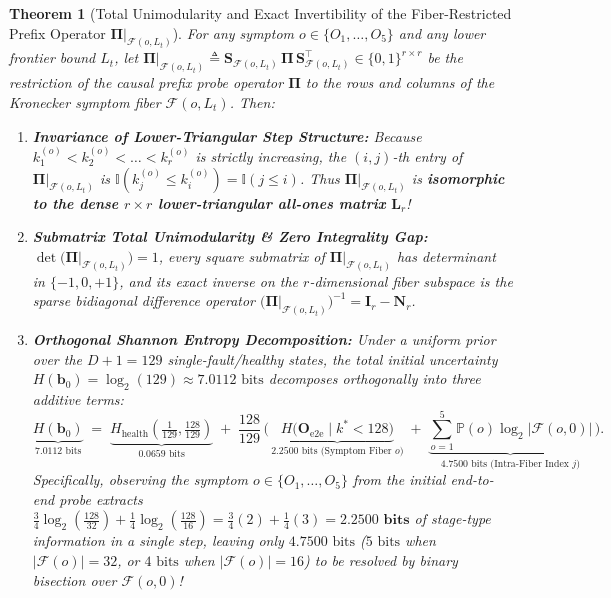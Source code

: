 \documentclass[11pt,a4paper]{article}
\newtheorem{theorem}{Theorem}[section]
\theoremstyle{definition}
\theoremstyle{remark}
\begin{document}
\begin{theorem}[Total Unimodularity and Exact Invertibility of the Fiber-Restricted Prefix Operator $\bm{\Pi}|_{\mathcal{F}(o, L_t)}$]
For any symptom $o \in \{O_1, \dots, O_5\}$ and any lower frontier bound $L_t$, let $\bm{\Pi}|_{\mathcal{F}(o, L_t)} \triangleq \bm{S}_{\mathcal{F}(o, L_t)} \, \bm{\Pi} \, \bm{S}_{\mathcal{F}(o, L_t)}^\top \in \{0,1\}^{r \times r}$ be the restriction of the causal prefix probe operator $\bm{\Pi}$ to the rows and columns of the Kronecker symptom fiber $\mathcal{F}(o, L_t)$. Then:
\begin{enumerate}
    \item \textbf{Invariance of Lower-Triangular Step Structure:} Because $k_1^{(o)} < k_2^{(o)} < \dots < k_r^{(o)}$ is strictly increasing, the $(i, j)$-th entry of $\bm{\Pi}|_{\mathcal{F}(o, L_t)}$ is $\mathbb{I}(k_j^{(o)} \le k_i^{(o)}) = \mathbb{I}(j \le i)$. Thus $\bm{\Pi}|_{\mathcal{F}(o, L_t)}$ is \textbf{isomorphic to the dense $r \times r$ lower-triangular all-ones matrix $\bm{L}_r$}!
    \item \textbf{Submatrix Total Unimodularity \& Zero Integrality Gap:} $\det\big(\bm{\Pi}|_{\mathcal{F}(o, L_t)}\big) = 1$, every square submatrix of $\bm{\Pi}|_{\mathcal{F}(o, L_t)}$ has determinant in $\{-1, 0, +1\}$, and its exact inverse on the $r$-dimensional fiber subspace is the sparse bidiagonal difference operator $\big(\bm{\Pi}|_{\mathcal{F}(o, L_t)}\big)^{-1} = \bm{I}_r - \bm{N}_r$.
    \item \textbf{Orthogonal Shannon Entropy Decomposition:} Under a uniform prior over the $D+1 = 129$ single-fault/healthy states, the total initial uncertainty $H(\bm{b}_0) = \log_2(129) \approx 7.0112\text{ bits}$ decomposes orthogonally into three additive terms:
    \begin{equation}
        \underbrace{H(\bm{b}_0)}_{7.0112\text{ bits}} \;=\;
        \underbrace{H_{\text{health}}\!\left(\tfrac{1}{129}, \tfrac{128}{129}\right)}_{0.0659\text{ bits}} \;+\;
        \frac{128}{129}\,\Bigg(\,
            \underbrace{H\big(\bm{O}_{\text{e2e}} \mid k^* < 128\big)}_{2.2500\text{ bits (Symptom Fiber } o\text{)}} \;+\;
            \underbrace{\sum_{o=1}^{5} \mathbb{P}(o) \log_2 |\mathcal{F}(o, 0)|}_{4.7500\text{ bits (Intra-Fiber Index } j\text{)}}
        \,\Bigg).
    \end{equation}
    Specifically, observing the symptom $o \in \{O_1, \dots, O_5\}$ from the initial end-to-end probe extracts $\frac{3}{4}\log_2\!\left(\frac{128}{32}\right) + \frac{1}{4}\log_2\!\left(\frac{128}{16}\right) = \frac{3}{4}(2) + \frac{1}{4}(3) = \mathbf{2.2500\text{ bits}}$ of stage-type information in a single step, leaving only $4.7500\text{ bits}$ ($5\text{ bits}$ when $|\mathcal{F}(o)|=32$, or $4\text{ bits}$ when $|\mathcal{F}(o)|=16$) to be resolved by binary bisection over $\mathcal{F}(o, 0)$!
\end{enumerate}
\end{theorem}
\end{document}
